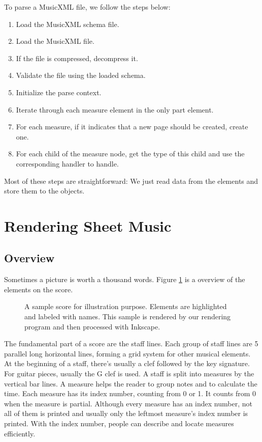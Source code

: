 To parse a MusicXML file, we follow the steps below:
\begin{enumerate}
    \item Load the MusicXML schema file.
    \item Load the MusicXML file.
    \item If the file is compressed, decompress it.
    \item Validate the file using the loaded schema.
    \item Initialize the parse context.
    \item Iterate through each measure element in the only part element.
    \item For each measure, if it indicates that a new page should be created, create one.
    \item For each child of the measure node, get the type of this child and use the corresponding handler to handle.
\end{enumerate}

Most of these steps are straightforward: We just read data from the elements and store them to the objects.


\section{Rendering Sheet Music}
\label{section:rendering-sheet-music}

\subsection{Overview}
Sometimes a picture is worth a thousand words. Figure \ref{fig:score-overview} is a overview of the elements on the score. 
\begin{figure}[t]
    \begin{center}
    \end{center}
    \caption{A sample score for illustration purpose. Elements are highlighted and labeled with names. This sample is rendered by our rendering program and then processed with Inkscape.}
    \label{fig:score-overview}
\end{figure}

The fundamental part of a score are the staff lines. Each group of staff lines are 5 parallel long horizontal lines, forming a grid system for other musical elements. At the beginning of a staff, there's usually a clef followed by the key signature. For guitar pieces, usually the G clef is used. 
A staff is split into measures by the vertical bar lines. A measure helps the reader to group notes and to calculate the time. Each measure has its index number, counting from 0 or 1. It counts from 0 when the measure is partial. Although every measure has an index number, not all of them is printed and usually only the leftmost measure's index number is printed. With the index number, people can describe and locate measures efficiently. 

